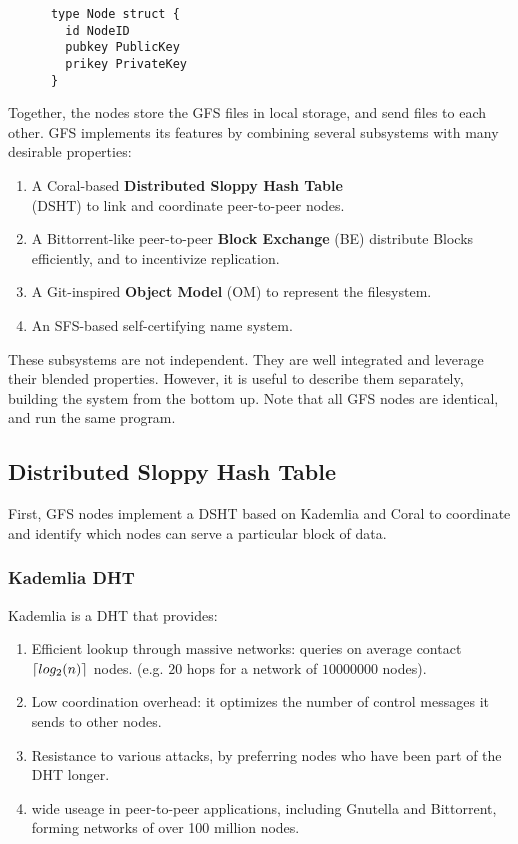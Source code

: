 \documentclass{sig-alternate}
\DeclarePairedDelimiter{\ceil}{\lceil}{\rceil}
\begin{document}
\begin{verbatim}
      type Node struct {
        id NodeID
        pubkey PublicKey
        prikey PrivateKey
      }
\end{verbatim}


Together, the
nodes store the GFS files in local storage, and send files to each other.
GFS implements its features by combining several subsystems with many
desirable properties:

\begin{enumerate}
  \item A Coral-based \textbf{Distributed Sloppy Hash Table}\\
        (DSHT) to link and coordinate peer-to-peer nodes.
  \item A Bittorrent-like peer-to-peer \textbf{Block Exchange} (BE) distribute
        Blocks efficiently, and to incentivize replication.
  \item A Git-inspired \textbf{Object Model} (OM) to represent the filesystem.
  \item An SFS-based self-certifying name system.
\end{enumerate}


These subsystems are not independent. They are well integrated and leverage
their blended properties. However, it is useful to describe them separately,
building the system from the bottom up. Note that all GFS nodes are identical,
and run the same program.

\subsection{Distributed Sloppy Hash Table}

First, GFS nodes implement a DSHT based on Kademlia and Coral to coordinate
and identify which nodes can serve a particular block of data.

\subsubsection{Kademlia DHT}

Kademlia is a DHT that provides:

\begin{enumerate}

  \item Efficient lookup through massive networks:
        queries on average contact $ \ceil{log_2 (n)} $ nodes.
        (e.g. $20$ hops for a network of $10000000$ nodes).

  \item Low coordination overhead: it optimizes the number of
        control messages it sends to other nodes.

  \item Resistance to various attacks, by preferring nodes who have been
        part of the DHT longer.

  \item wide useage in peer-to-peer applications, including Gnutella and
        Bittorrent, forming networks of over 100 million nodes.

 \end{enumerate}
\end{document}
